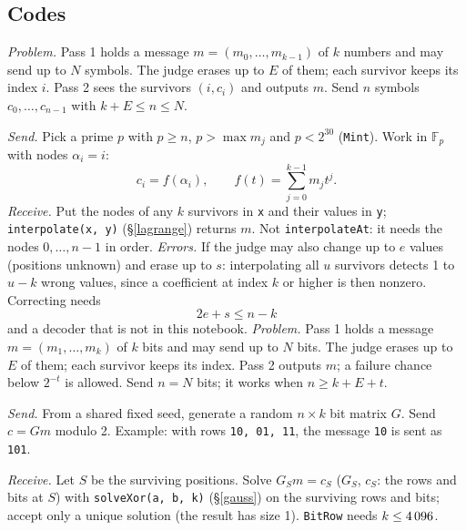 \subsection{Codes}
\label{linearcodes}
{\footnotesize\tightdisplay
{}
\textit{Problem.} Pass 1 holds a message $m=(m_0,\ldots,m_{k-1})$ of $k$ numbers and may send up to $N$ symbols. The judge erases up to $E$ of them; each survivor keeps its index $i$. Pass 2 sees the survivors $(i,c_i)$ and outputs $m$. Send $n$ symbols $c_0,\ldots,c_{n-1}$ with $k+E\le n\le N$.
\par\textit{Send.} Pick a prime $p$ with $p\ge n$, $p>\max m_j$ and $p<2^{30}$ (\texttt{Mint}). Work in $\mathbb F_p$ with nodes $\alpha_i=i$:
\[ c_i=f(\alpha_i),\qquad f(t)=\sum_{j=0}^{k-1}m_j t^j. \]
\textit{Receive.} Put the nodes of any $k$ survivors in \texttt{x} and their values in \texttt{y}; \texttt{interpolate(x, y)} (\S\ref{lagrange}) returns $m$. Not \texttt{interpolateAt}: it needs the nodes $0,\ldots,n-1$ in order.
\textit{Errors.} If the judge may also change up to $e$ values (positions unknown) and erase up to $s$: interpolating all $u$ survivors detects 1 to $u-k$ wrong values, since a coefficient at index $k$ or higher is then nonzero. Correcting needs
\[ 2e+s\le n-k \]
and a decoder that is not in this notebook.
\textit{Problem.} Pass 1 holds a message $m=(m_1,\ldots,m_k)$ of $k$ bits and may send up to $N$ bits. The judge erases up to $E$ of them; each survivor keeps its index. Pass 2 outputs $m$; a failure chance below $2^{-t}$ is allowed. Send $n=N$ bits; it works when $n\ge k+E+t$.
\par\textit{Send.} From a shared fixed seed, generate a random $n\times k$ bit matrix $G$. Send $c=Gm$ modulo 2. Example: with rows \texttt{10, 01, 11}, the message \texttt{10} is sent as \texttt{101}.
\par\textit{Receive.} Let $S$ be the surviving positions. Solve $G_S m=c_S$ ($G_S$, $c_S$: the rows and bits at $S$) with \texttt{solveXor(a, b, k)} (\S\ref{gauss}) on the surviving rows and bits; accept only a unique solution (the result has size 1). \texttt{BitRow} needs $k\le4\,096$.
}
